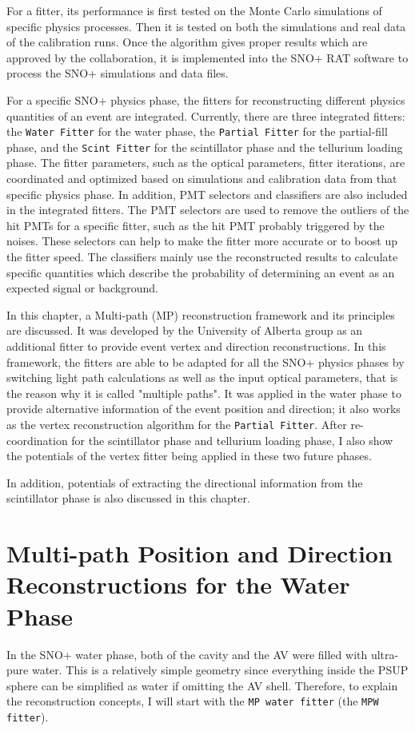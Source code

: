 For a fitter, its performance is first tested on the Monte Carlo simulations of specific physics processes. Then it is tested on both the simulations and real data of the calibration runs. Once the algorithm gives proper results which are approved by the collaboration, it is implemented into the SNO+ RAT software to process the SNO+ simulations and data files.

For a specific SNO+ physics phase, the fitters for reconstructing different physics quantities of an event are integrated. Currently, there are three integrated fitters: the \texttt{Water Fitter} for the water phase, the \texttt{Partial Fitter} for the partial-fill phase, and the \texttt{Scint Fitter} for the scintillator phase and the tellurium loading phase. The fitter parameters, such as the optical parameters, fitter iterations, are coordinated and optimized based on simulations and calibration data from that specific physics phase. In addition, PMT selectors and classifiers are also included in the integrated fitters. The PMT selectors are used to remove the outliers of the hit PMTs for a specific fitter, such as the hit PMT probably triggered by the noises. These selectors can help to make the fitter more accurate or to boost up the fitter speed. The classifiers mainly use the reconstructed results to calculate specific quantities which describe the probability of determining an event as an expected signal or background.

In this chapter, a Multi-path (MP) reconstruction framework and its principles are discussed. It was developed by the University of Alberta group as an additional fitter to provide event vertex and direction reconstructions. In this framework, the fitters are able to be adapted for all the SNO+ physics phases by switching light path calculations as well as the input optical parameters, that is the reason why it is called "multiple paths". It was applied in the water phase to provide alternative information of the event position and direction; it also works as the vertex reconstruction algorithm for the \texttt{Partial Fitter}. After re-coordination for the scintillator phase and tellurium loading phase, I also show the potentials of the vertex fitter being applied in these two future phases.

In addition, potentials of extracting the directional information from the scintillator phase is also discussed in this chapter.

\section{Multi-path Position and Direction Reconstructions for the Water Phase}\label{sect:mpw}
In the SNO+ water phase, both of the cavity and the AV were filled with ultra-pure water. This is a relatively simple geometry since everything inside the PSUP sphere can be simplified as water if omitting the AV shell. Therefore, to explain the reconstruction concepts, I will start with the \texttt{MP water fitter} (the \texttt{MPW fitter}).

